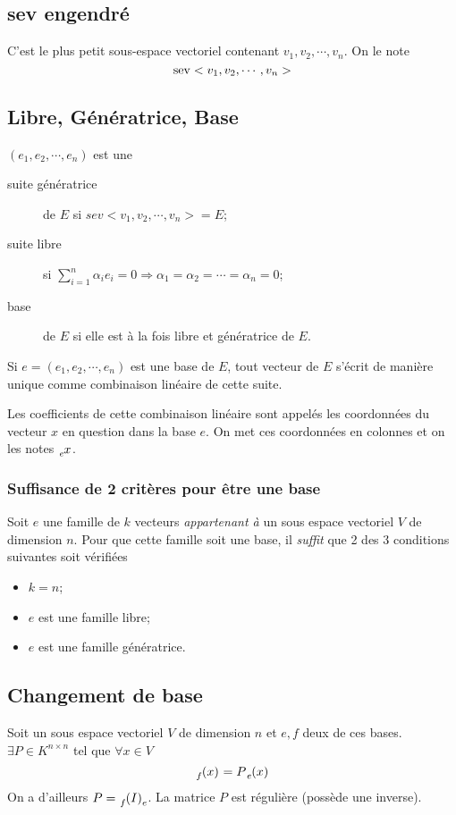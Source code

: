 \subsection{sev engendré}
C'est le plus petit sous-espace vectoriel contenant $v_1, v_2, \cdots ,v_n$.
On le note
\[ \operatorname{sev}< v_1, v_2, \cdots, v_n> \]

\subsection{Libre, Génératrice, Base}
$(e_1, e_2, \cdots , e_n)$ est une
\begin{description}
  \item[suite génératrice] de $E$ si $sev<v_1, v_2, \cdots , v_n> = E$;
  \item[suite libre] si $\sum_{i = 1}^{n}\alpha_ie_i = 0
    \Rightarrow \alpha_1 = \alpha_2 = \cdots = \alpha_n = 0$;
  \item[base] de $E$ si elle est à la fois libre et génératrice de $E$.
\end{description}
Si $e = (e_1, e_2, \cdots , e_n)$ est une base de $E$, tout vecteur de $E$ s'écrit
de manière unique comme combinaison linéaire de cette suite.

Les coefficients de cette combinaison linéaire sont appelés les coordonnées
du vecteur $x$ en question dans la base $e$.
On met ces coordonnées en colonnes et on les notes $\tensor*[_e]{x}{}$.

\subsubsection{Suffisance de 2 critères pour être une base}
Soit $e$ une famille de $k$ vecteurs \emph{appartenant à} un
sous espace vectoriel $V$ de dimension $n$.
Pour que cette famille soit une base,
il \emph{suffit} que 2 des 3 conditions suivantes soit vérifiées
\begin{itemize}
  \item $k = n$;
  \item $e$ est une famille libre;
  \item $e$ est une famille génératrice.
\end{itemize}

\subsection{Changement de base}
\label{sec:changementdebase}
Soit un sous espace vectoriel $V$ de dimension $n$ et $e, f$ deux de ces bases.
$\exists P \in K^{n \times n}$ tel que $\forall x \in V$
\[ \tensor*[_f]{(x)}{} = P\tensor*[_e]{(x)}{} \]
On a d'ailleurs $P = \tensor*[_f]{(I)}{_e}$.
La matrice $P$ est régulière (possède une inverse).


